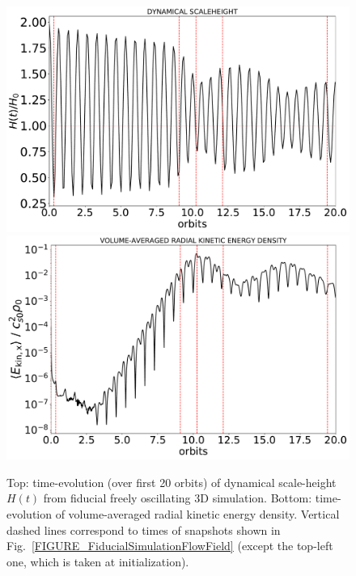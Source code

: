 \documentclass[fleqn,usenatbib]{mnras}
\begin{document}
\begin{figure}
\centering
\includegraphics[scale=0.22]{Figures/figure00PRODUCTION_VSTRHYDRORes32Re4687H6BouncezBCReflectiveLx8H_timeevolution_dynamicalH.pdf}
\includegraphics[scale=0.22]{Figures/figure00PRODUCTION_VSTRHYDRORes32Re4687H6BouncezBCReflectiveLx8H_timeevolution_volavg_kineticenergydensity_xcomp.pdf}
\caption{Top: time-evolution (over first 20 orbits) of dynamical scale-height $H(t)$ from fiducial freely oscillating 3D simulation. Bottom: time-evolution of volume-averaged radial kinetic energy density. Vertical dashed lines correspond to times of snapshots shown in Fig.~\ref{FIGURE_FiducialSimulationFlowField} (except the top-left one, which is taken at initialization).}
\label{FIGURE_FiducialSimTimeEvolutionDynamicalHAndEkinx}
\end{figure}
\end{document}
